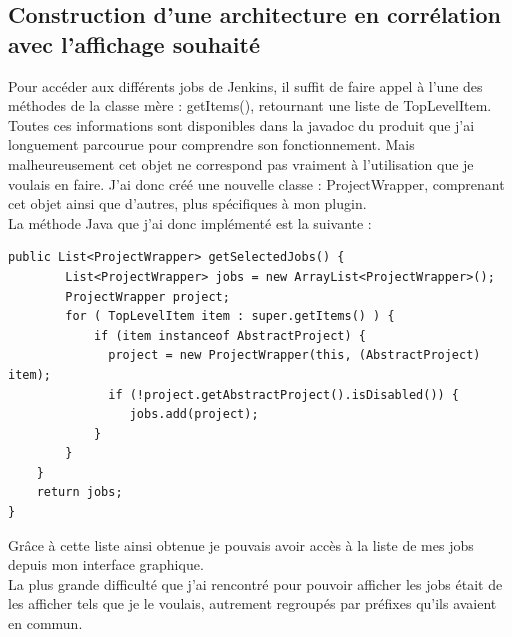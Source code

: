 \subsection{Construction d'une architecture en corrélation avec l'affichage souhaité}
Pour accéder aux différents jobs de Jenkins, il suffit de faire appel à l'une des méthodes de la classe mère : getItems(), retournant une liste de TopLevelItem. Toutes ces informations sont disponibles dans la javadoc du produit que j'ai longuement parcourue pour comprendre son fonctionnement. Mais malheureusement cet objet ne correspond pas vraiment à l'utilisation que je voulais en faire. J'ai donc créé une nouvelle classe : ProjectWrapper, comprenant cet objet ainsi que d'autres, plus spécifiques à mon plugin.\\


La méthode \gls{Java} que j'ai donc implémenté est la suivante :\\
\begin{lstlisting}
public List<ProjectWrapper> getSelectedJobs() {
        List<ProjectWrapper> jobs = new ArrayList<ProjectWrapper>();
        ProjectWrapper project;
        for ( TopLevelItem item : super.getItems() ) {
            if (item instanceof AbstractProject) {
              project = new ProjectWrapper(this, (AbstractProject) item);
              if (!project.getAbstractProject().isDisabled()) {
                 jobs.add(project);
            }
        }
    }
    return jobs;
}
\end{lstlisting}
		
Grâce à cette liste ainsi obtenue je pouvais avoir accès à la liste de mes jobs depuis mon interface graphique.\\
La plus grande difficulté que j'ai rencontré pour pouvoir afficher les jobs était de les afficher tels que je le voulais, autrement regroupés par préfixes qu'ils avaient en commun.\\

